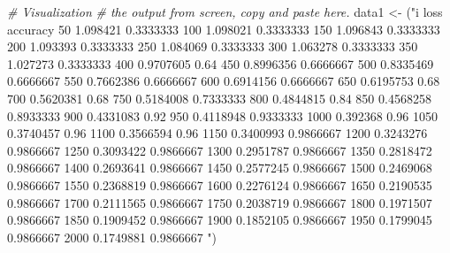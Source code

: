 \documentclass[]{book}
\newenvironment{Shaded}{\begin{snugshade}}{\end{snugshade}}
\newcommand{\CommentTok}[1]{\textcolor[rgb]{0.56,0.35,0.01}{\textit{#1}}}
\newcommand{\NormalTok}[1]{#1}
\newcommand{\StringTok}[1]{\textcolor[rgb]{0.31,0.60,0.02}{#1}}
\begin{document}
\begin{Shaded}
\begin{Highlighting}[]

\CommentTok{# Visualization}
\CommentTok{# the output from screen, copy and paste here.}
\NormalTok{data1 <-}\StringTok{ }\NormalTok{(}\StringTok{"i loss accuracy}
\StringTok{50 1.098421 0.3333333 }
\StringTok{100 1.098021 0.3333333 }
\StringTok{150 1.096843 0.3333333 }
\StringTok{200 1.093393 0.3333333 }
\StringTok{250 1.084069 0.3333333 }
\StringTok{300 1.063278 0.3333333 }
\StringTok{350 1.027273 0.3333333 }
\StringTok{400 0.9707605 0.64 }
\StringTok{450 0.8996356 0.6666667 }
\StringTok{500 0.8335469 0.6666667 }
\StringTok{550 0.7662386 0.6666667 }
\StringTok{600 0.6914156 0.6666667 }
\StringTok{650 0.6195753 0.68 }
\StringTok{700 0.5620381 0.68 }
\StringTok{750 0.5184008 0.7333333 }
\StringTok{800 0.4844815 0.84 }
\StringTok{850 0.4568258 0.8933333 }
\StringTok{900 0.4331083 0.92 }
\StringTok{950 0.4118948 0.9333333 }
\StringTok{1000 0.392368 0.96 }
\StringTok{1050 0.3740457 0.96 }
\StringTok{1100 0.3566594 0.96 }
\StringTok{1150 0.3400993 0.9866667 }
\StringTok{1200 0.3243276 0.9866667 }
\StringTok{1250 0.3093422 0.9866667 }
\StringTok{1300 0.2951787 0.9866667 }
\StringTok{1350 0.2818472 0.9866667 }
\StringTok{1400 0.2693641 0.9866667 }
\StringTok{1450 0.2577245 0.9866667 }
\StringTok{1500 0.2469068 0.9866667 }
\StringTok{1550 0.2368819 0.9866667 }
\StringTok{1600 0.2276124 0.9866667 }
\StringTok{1650 0.2190535 0.9866667 }
\StringTok{1700 0.2111565 0.9866667 }
\StringTok{1750 0.2038719 0.9866667 }
\StringTok{1800 0.1971507 0.9866667 }
\StringTok{1850 0.1909452 0.9866667 }
\StringTok{1900 0.1852105 0.9866667 }
\StringTok{1950 0.1799045 0.9866667 }
\StringTok{2000 0.1749881 0.9866667  "}\NormalTok{)}


\end{Highlighting}
\end{Shaded}
\end{document}
